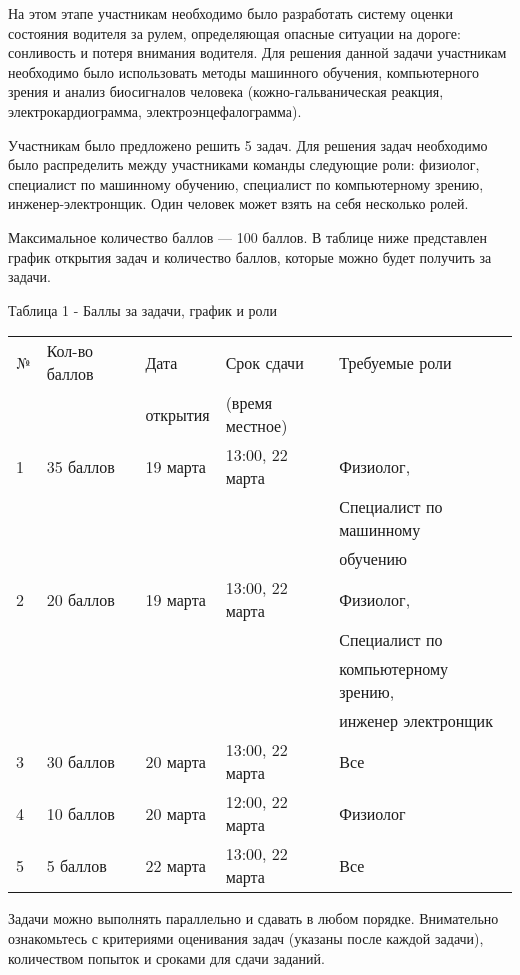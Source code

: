 На этом этапе участникам необходимо было разработать систему оценки состояния водителя за рулем, определяющая опасные ситуации на дороге: сонливость и потеря внимания водителя. Для решения данной задачи участникам необходимо было использовать методы машинного обучения, компьютерного зрения и анализ биосигналов человека (кожно-гальваническая реакция, электрокардиограмма, электроэнцефалограмма).

Участникам было предложено решить 5 задач. Для решения задач необходимо было распределить между участниками команды следующие роли: физиолог, специалист по машинному обучению, специалист по компьютерному зрению, инженер-электронщик. Один человек может взять на себя несколько ролей. 

Максимальное количество баллов — 100 баллов. В таблице ниже представлен график открытия задач и количество баллов, которые можно будет получить за задачи.

\begin{table}[H]
    Таблица 1 - Баллы за задачи, график и роли
    
    \begin{tabular}{|l|l|l|l|l|}
    \hline
    № &	Кол-во баллов & Дата & Срок сдачи & Требуемые роли \\
                    & & открытия & (время местное) &  \\            
    \hline
    1 & 35 баллов & 19 марта & 13:00, 22 марта & Физиолог, \\
                                             & & & & Специалист по машинному \\
                                             & & & & обучению \\
    \hline
                                             2 & 20 баллов & 19 марта & 13:00, 22 марта & Физиолог, \\
                                              & & & & Специалист по \\ 
                                              & & & & компьютерному зрению, \\
                                              & & & & инженер электронщик \\
    \hline
    3 & 30 баллов & 20 марта & 13:00, 22 марта & Все \\
    \hline
    4 & 10 баллов & 20 марта & 12:00, 22 марта & Физиолог \\
    \hline
    5 & 5 баллов & 22 марта & 13:00, 22 марта & Все \\
    \hline
    \end{tabular}
\end{table}

Задачи можно выполнять параллельно и сдавать в любом порядке. Внимательно ознакомьтесь с критериями оценивания задач (указаны после каждой задачи), количеством попыток и сроками для сдачи заданий.